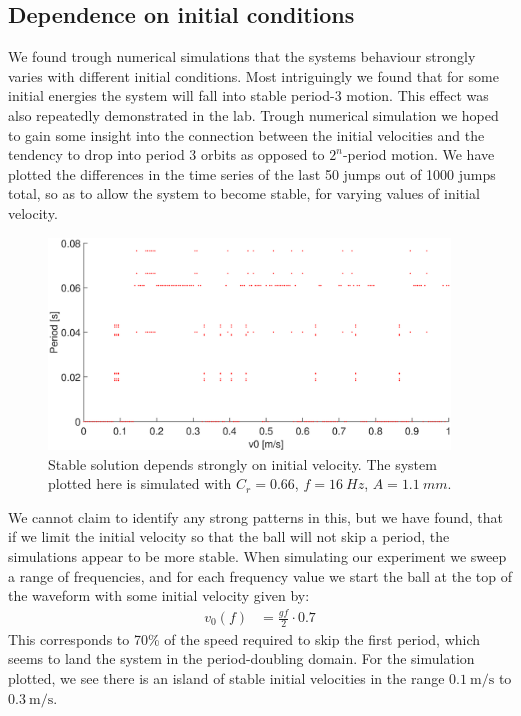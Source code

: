 \documentclass[12pt,oneside,a4paper]{article}
\numberwithin{equation}{section}
\begin{document}
{{{{\subsection{Dependence on initial conditions}
We found trough numerical simulations that the systems behaviour strongly varies with different initial conditions. Most intriguingly we found that for some initial energies the system will fall into stable period-3 motion. This effect was also repeatedly demonstrated in the lab. Trough numerical simulation we hoped to gain some insight into the connection between the initial velocities and the tendency to drop into period 3 orbits as opposed to $2^n$-period motion. We have plotted the differences in the time series of the last 50 jumps out of 1000 jumps total, so as to allow the system to become stable, for varying values of initial velocity. 
\begin{figure}[h!]
\centering
\includegraphics[width=0.95\textwidth]{vsweep.eps}
\caption{Stable solution depends strongly on initial velocity. The system plotted here is simulated with $C_r=0.66$, $f=\SI{16}{Hz}$, $A=\SI{1.1}{mm}$.}
\end{figure}
We cannot claim to identify any strong patterns in this, but we have found, that if we limit the initial velocity so that the ball will not skip a period, the simulations appear to be more stable. When simulating our experiment we sweep a range of frequencies, and for each frequency value we start the ball at the top of the waveform with some initial velocity given by:
\begin{align*}
v_0(f) &= \frac{g f}{2} \cdot 0.7 
\end{align*}
This corresponds to 70\% of the speed required to skip the first period, which seems to land the system in the period-doubling domain. For the simulation plotted, we see there is an island of stable initial velocities in the range $\SI{0.1}{\meter\per\second}$ to $\SI{0.3}{\meter\per\second}$.
}}}}
\end{document}
